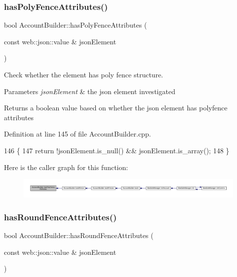 \subsubsection{\texorpdfstring{has\+Poly\+Fence\+Attributes()}{hasPolyFenceAttributes()}}
{\footnotesize\ttfamily bool Account\+Builder\+::has\+Poly\+Fence\+Attributes (\begin{DoxyParamCaption}\item[{const web\+::json\+::value \&}]{json\+Element }\end{DoxyParamCaption})\hspace{0.3cm}{\ttfamily [private]}}

Check whether the element has poly fence structure.


\begin{DoxyParams}{Parameters}
{\em json\+Element} & the json element investigated \\
\hline
\end{DoxyParams}
\begin{DoxyReturn}{Returns}
a boolean value based on whether the json element has polyfence attributes 
\end{DoxyReturn}


Definition at line 145 of file Account\+Builder.\+cpp.


\begin{DoxyCode}
146 \{
147     \textcolor{keywordflow}{return} !jsonElement.is\_null() && jsonElement.is\_array();
148 \}
\end{DoxyCode}
Here is the caller graph for this function\+:\nopagebreak
\begin{figure}[H]
\begin{center}
\leavevmode
\includegraphics[width=350pt]{d9/daa/class_account_builder_a426cb519ae4c5f0594f0f1e41e9f5a73_icgraph}
\end{center}
\end{figure}
\mbox{\label{class_account_builder_aea9045a135dac995cbf409b61c5850bf}} 
\subsubsection{\texorpdfstring{has\+Round\+Fence\+Attributes()}{hasRoundFenceAttributes()}}
{\footnotesize\ttfamily bool Account\+Builder\+::has\+Round\+Fence\+Attributes (\begin{DoxyParamCaption}\item[{const web\+::json\+::value \&}]{json\+Element }\end{DoxyParamCaption})\hspace{0.3cm}{\ttfamily [private]}}

